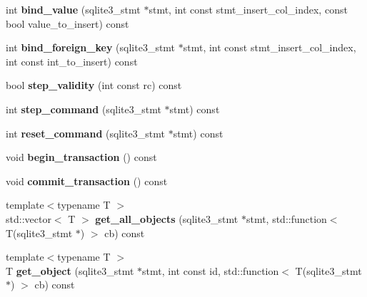 \begin{DoxyCompactItemize}
\item 
\mbox{\label{class_s_q_lite_wrapper_a4b6f58f924fae97702115f34ea8abf22}} 
int {\bfseries bind\+\_\+value} (sqlite3\+\_\+stmt $\ast$stmt, int const stmt\+\_\+insert\+\_\+col\+\_\+index, const bool value\+\_\+to\+\_\+insert) const
\item 
\mbox{\label{class_s_q_lite_wrapper_a21b4c5733febabb2a4f21772b7cfdec1}} 
int {\bfseries bind\+\_\+foreign\+\_\+key} (sqlite3\+\_\+stmt $\ast$stmt, int const stmt\+\_\+insert\+\_\+col\+\_\+index, int const int\+\_\+to\+\_\+insert) const
\item 
\mbox{\label{class_s_q_lite_wrapper_a2c0169834d2518ede1f00b92ffbed3e2}} 
bool {\bfseries step\+\_\+validity} (int const rc) const
\item 
\mbox{\label{class_s_q_lite_wrapper_aed2fd5a33db820461662e6ffdc05808b}} 
int {\bfseries step\+\_\+command} (sqlite3\+\_\+stmt $\ast$stmt) const
\item 
\mbox{\label{class_s_q_lite_wrapper_aeef995f134463b92babcd805444a1783}} 
int {\bfseries reset\+\_\+command} (sqlite3\+\_\+stmt $\ast$stmt) const
\item 
\mbox{\label{class_s_q_lite_wrapper_a7390f800549dbb01bb6bea58f3834c0c}} 
void {\bfseries begin\+\_\+transaction} () const
\item 
\mbox{\label{class_s_q_lite_wrapper_a80905f75cc7115658a61037a4c7a2e62}} 
void {\bfseries commit\+\_\+transaction} () const
\item 
\mbox{\label{class_s_q_lite_wrapper_ad729120a855cf8db16940f9798897cc5}} 
{\footnotesize template$<$typename T $>$ }\\std\+::vector$<$ T $>$ {\bfseries get\+\_\+all\+\_\+objects} (sqlite3\+\_\+stmt $\ast$stmt, std\+::function$<$ T(sqlite3\+\_\+stmt $\ast$) $>$ cb) const
\item 
\mbox{\label{class_s_q_lite_wrapper_a7b08d5d170b1c19f7a0be0ecdec4195e}} 
{\footnotesize template$<$typename T $>$ }\\T {\bfseries get\+\_\+object} (sqlite3\+\_\+stmt $\ast$stmt, int const id, std\+::function$<$ T(sqlite3\+\_\+stmt $\ast$) $>$ cb) const

\end{DoxyCompactItemize}

